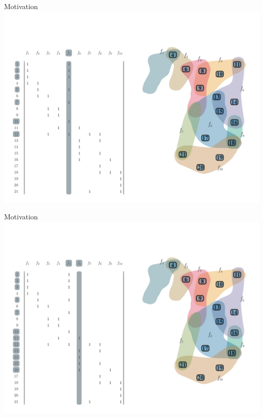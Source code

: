 \documentclass[10pt]{beamer}
\begin{document}
\begin{frame}[fragile]{Motivation}
    \vspace*{-3em}\hspace*{-2em}\includegraphics[width=1.15\textwidth]{Images/LSAExample/04}
\end{frame}

\begin{frame}[fragile]{Motivation}
    \vspace*{-3em}\hspace*{-2em}\includegraphics[width=1.15\textwidth]{Images/LSAExample/05}
\end{frame}
\end{document}
